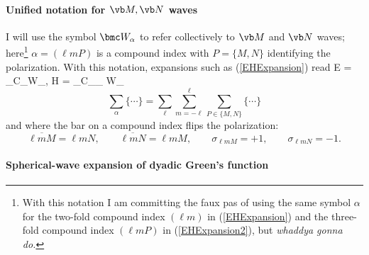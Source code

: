\documentclass[letterpaper]{article}
\begin{document}
\paragraph{Unified notation for $\vb M, \vb N$ waves}

I will use the symbol $\bmc W_\alpha$ to refer
collectively to $\vb M$ and $\vb N$ waves;
here\footnote{With this notation I am committing the
faux pas of using the same symbol $\alpha$ for
the two-fold compound index $(\ell m)$ in (\ref{EHExpansion})
and the three-fold compound index $(\ell m P)$ in
(\ref{EHExpansion2}), but \textit{whaddya gonna do.}}
$\alpha=(\ell m P)$ is a compound index
with $P=\{M,N\}$ identifying the polarization.
With this notation, expansions such as (\ref{EHExpansion})
read
{\vb E = \sum_\alpha C_\alpha \bmc W_\alpha, \qquad
   \vb H = 
   \sum_\alpha C_\alpha \sigma_{\alpha} \bmc W_{\overline{\alpha}}
}
$$ \sum_\alpha\{\cdots\} 
   = 
   \sum_{\ell}\sum_{m=-\ell}^\ell \sum_{P\in \{M,N\}} \{\cdots\}
$$
and where the bar on a compound index flips the polarization:
$$
   \overline{\ell m M} = \ell m N, \qquad
   \overline{\ell m N} = \ell m M, \qquad
   \sigma_{\ell m M}=+1, \qquad
   \sigma_{\ell m N}=-1.
$$
\paragraph{Spherical-wave expansion of dyadic Green's function}
\end{document}
